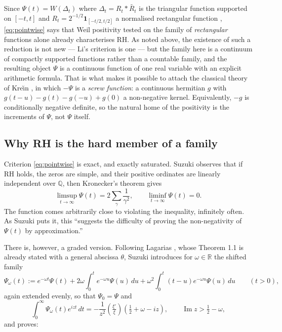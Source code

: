 \documentclass[11pt,reqno]{amsart}
\theoremstyle{plain}
\theoremstyle{definition}
\newcommand{\R}{\mathbb{R}}
\newcommand{\Ip}{\operatorname{Im}}
\newcommand{\lxi}[1]{\left(\tfrac{\xi'}{\xi}\right)\!#1}
\begin{document}
Since $\Psi(t)=W(\Delta_t)$ where $\Delta_t=R_t*\widetilde{R_t}$ is the triangular function
supported on $[-t,t]$ and $R_t=2^{-1/2}\mathbf{1}_{[-t/2,t/2]}$ a normalised rectangular function
\cite[\S3.4]{Suzuki2023}, \eqref{eq:pointwise} says that Weil positivity tested on the family of
\emph{rectangular} functions alone already characterises RH. As noted above, the existence of such a
reduction is not new --- Li's criterion is one --- but the family here is a continuum of compactly
supported functions rather than a countable family, and the resulting object $\Psi$ is a continuous
function of one real variable with an explicit arithmetic formula. That is what makes it possible to
attach the classical theory of Kre\u\i n \cite{KreinLanger}, in which $-\Psi$ is a \emph{screw
function}: a continuous hermitian $g$ with $g(t-u)-g(t)-g(-u)+g(0)$ a non-negative kernel.
Equivalently, $-g$ is conditionally negative definite, so the natural home of the positivity is the
increments of $\Psi$, not $\Psi$ itself.

\subsection{Why RH is the hard member of a family}

Criterion \eqref{eq:pointwise} is exact, and exactly saturated. Suzuki observes
\cite[\S7.1]{Suzuki2023} that if RH holds, the zeros are simple, and their positive ordinates are
linearly independent over $\mathbb{Q}$, then Kronecker's theorem gives
\begin{equation}\label{eq:liminf}
  \limsup_{t\to\infty}\Psi(t)=2\sum_\gamma\frac{1}{\gamma^{2}},
  \qquad
  \liminf_{t\to\infty}\Psi(t)=0 .
\end{equation}
The function comes arbitrarily close to violating the inequality, infinitely often. As Suzuki puts
it, this ``suggests the difficulty of proving the non-negativity of $\Psi(t)$ by approximation.''

There is, however, a graded version. Following Lagarias \cite{Lagarias1999}, whose Theorem 1.1 is
already stated with a general abscissa $\theta$, Suzuki introduces \cite[\S11]{Suzuki2023} for
$\omega\in\R$ the shifted family
\begin{equation}\label{eq:Psiomegadef}
  \Psi_\omega(t):=e^{-\omega t}\Psi(t)+2\omega\int_0^t e^{-\omega u}\Psi(u)\,du
  +\omega^{2}\int_0^t (t-u)e^{-\omega u}\Psi(u)\,du \qquad(t>0),
\end{equation}
again extended evenly, so that $\Psi_0=\Psi$ and
\begin{equation}\label{eq:PsiomegaLaplace}
  \int_0^\infty\Psi_\omega(t)e^{izt}\,dt=-\frac1{z^{2}}\lxi{\left(\tfrac12+\omega-iz\right)},
  \qquad \Ip z>\tfrac12-\omega,
\end{equation}
and proves:
\end{document}
